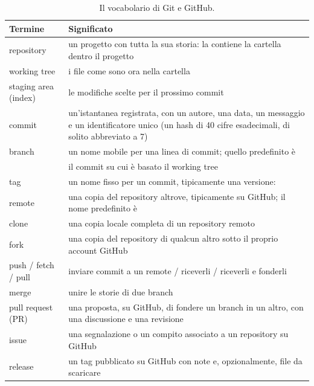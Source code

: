 \begin{table}[htb]
\centering\small
\caption{Il vocabolario di Git e GitHub.}\label{tab:git:terms}
\begin{tabularx}{\textwidth}{@{}lL@{}}
\toprule
\textbf{Termine} & \textbf{Significato}\\
\midrule
repository & un progetto con tutta la sua storia: la contiene la cartella  dentro il progetto\\
working tree & i file come sono ora nella cartella\\
staging area (index) & le modifiche scelte per il prossimo commit\\
commit & un'istantanea registrata, con un autore, una data, un messaggio e un identificatore unico (un hash di 40 cifre esadecimali, di solito abbreviato a 7)\\
branch & un nome mobile per una linea di commit; quello predefinito è \\
 & il commit su cui è basato il working tree\\
tag & un nome fisso per un commit, tipicamente una versione: \\
remote & una copia del repository altrove, tipicamente su GitHub; il nome predefinito è \\
clone & una copia locale completa di un repository remoto\\
fork & una copia del repository di qualcun altro sotto il proprio account GitHub\\
push / fetch / pull & inviare commit a un remote / riceverli / riceverli e fonderli\\
merge & unire le storie di due branch\\
pull request (PR) & una proposta, su GitHub, di fondere un branch in un altro, con una discussione e una revisione\\
issue & una segnalazione o un compito associato a un repository su GitHub\\
release & un tag pubblicato su GitHub con note e, opzionalmente, file da scaricare\\
\bottomrule
\end{tabularx}
\end{table}

